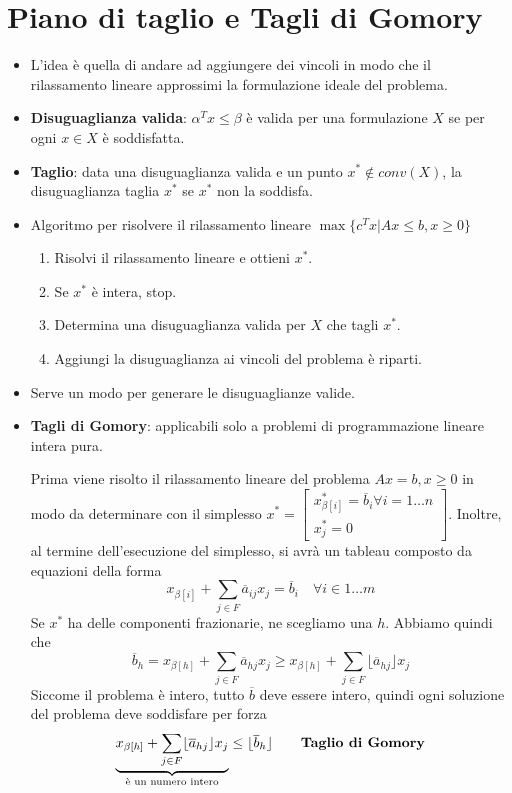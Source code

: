\section{Piano di taglio e Tagli di Gomory}

\begin{itemize}
	\item L'idea è quella di andare ad aggiungere dei vincoli in modo che il rilassamento lineare approssimi la formulazione ideale del problema.
	\item \textbf{Disuguaglianza valida}: $\alpha^T x \leq \beta$ è valida per una formulazione $X$ se per ogni $x \in X$ è soddisfatta.
	\item \textbf{Taglio}: data una disuguaglianza valida e un punto $x^* \not\in conv(X)$, la disuguaglianza taglia $x^*$ se $x^*$ non la soddisfa.
	\item Algoritmo per risolvere il rilassamento lineare $\max \{ c^T x | Ax \leq b, x \geq 0 \}$
	\begin{enumerate}
		\item Risolvi il rilassamento lineare e ottieni $x^*$.
		\item Se $x^*$ è intera, stop.
		\item Determina una disuguaglianza valida per $X$ che tagli $x^*$.
		\item Aggiungi la disuguaglianza ai vincoli del problema è riparti.
	\end{enumerate}
	\item Serve un modo per generare le disuguaglianze valide.
	\item \textbf{Tagli di Gomory}: applicabili solo a problemi di programmazione lineare intera pura.
	
	Prima viene risolto il rilassamento lineare del problema $Ax = b, x\geq 0$ in modo da determinare con il simplesso $x^* = \begin{bmatrix}
	x_{\beta[i]}^* = \overline{b}_i \forall i = 1\ldots n \\
	x_{j}^* = 0
	\end{bmatrix}$.
	Inoltre, al termine dell'esecuzione del simplesso, si avrà un tableau composto da equazioni della forma
	$$
	x_{\beta[i]} + \sum_{j \in F} \overline{a}_{ij}x_j = \overline{b}_i \quad \forall i \in 1 \ldots m
	$$
	Se $x^*$ ha delle componenti frazionarie, ne scegliamo una $h$.
	Abbiamo quindi che
	$$
	\overline{b}_h = x_{\beta[h]} + \sum_{j \in F} \overline{a}_{hj}x_j \geq  x_{\beta[h]} + \sum_{j \in F} \lfloor\overline{a}_{hj}\rfloor x_j
	$$
	Siccome il problema è intero, tutto $\overline{b}$ deve essere intero, quindi ogni soluzione del problema deve soddisfare per forza
	$$
	 \underbrace{x_{\beta[h]} + \sum_{j \in F} \lfloor \overline{a}_{hj} \rfloor x_j}_{\text{è un numero intero}} \leq  \lfloor \overline{b}_h\rfloor \qquad\text{\textbf{Taglio di Gomory}}
	$$
	

\end{itemize}
